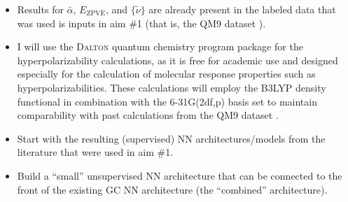 \documentclass[12pt]{article}
\begin{document}
\begin{itemize}
\item Results for \(\bar{\alpha}\), \(E_{\text{ZPVE}}\), and \(\{\tilde{\nu}\}\) are already present in the labeled data that was used is inputs in aim \#1 (that is, the QM9 dataset \cite{Ramakrishnan:2014ij}).

\item I will use the \textsc{Dalton} quantum chemistry program package \cite{daltonpaper} for the hyperpolarizability calculations, as it is free for academic use and designed especially for the calculation of molecular response properties such as hyperpolarizabilities. These calculations will employ the B3LYP density functional in combination with the 6-31G(2df,p) basis set to maintain comparability with past calculations from the QM9 dataset \cite{Ramakrishnan:2014ij}.

\item Start with the resulting (supervised) NN architectures/models from the literature that were used in aim \#1.

\item Build a ``small'' unsupervised NN architecture that can be connected to the front of the existing GC NN architecture (the ``combined'' architecture).
\end{itemize}
\end{document}
